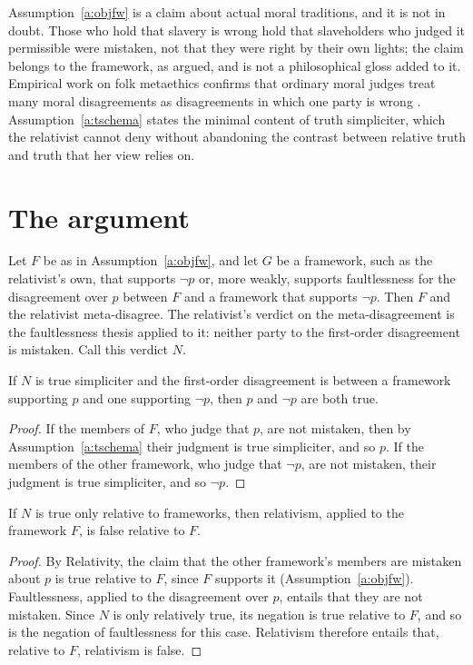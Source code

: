 \documentclass{situationist-preprint}
\begin{document}
Assumption~\ref{a:objfw} is a claim about actual moral traditions, and it is not in doubt. Those who hold that slavery is wrong hold that slaveholders who judged it permissible were mistaken, not that they were right by their own lights; the claim belongs to the framework, as \citet{Dworkin1996} argued, and is not a philosophical gloss added to it. Empirical work on folk metaethics confirms that ordinary moral judges treat many moral disagreements as disagreements in which one party is wrong \citep{GoodwinDarley2008}. Assumption~\ref{a:tschema} states the minimal content of truth simpliciter, which the relativist cannot deny without abandoning the contrast between relative truth and truth that her view relies on.

\section{The argument}

Let $F$ be as in Assumption~\ref{a:objfw}, and let $G$ be a framework, such as the relativist's own, that supports $\neg p$ or, more weakly, supports faultlessness for the disagreement over $p$ between $F$ and a framework that supports $\neg p$. Then $F$ and the relativist meta-disagree. The relativist's verdict on the meta-disagreement is the faultlessness thesis applied to it: neither party to the first-order disagreement is mistaken. Call this verdict $N$.

\begin{lemma}\label{l:abs}
If $N$ is true simpliciter and the first-order disagreement is between a framework supporting $p$ and one supporting $\neg p$, then $p$ and $\neg p$ are both true.
\end{lemma}

\begin{proof}
If the members of $F$, who judge that $p$, are not mistaken, then by Assumption~\ref{a:tschema} their judgment is true simpliciter, and so $p$. If the members of the other framework, who judge that $\neg p$, are not mistaken, their judgment is true simpliciter, and so $\neg p$.
\end{proof}

\begin{lemma}\label{l:rel}
If $N$ is true only relative to frameworks, then relativism, applied to the framework $F$, is false relative to $F$.
\end{lemma}

\begin{proof}
By Relativity, the claim that the other framework's members are mistaken about $p$ is true relative to $F$, since $F$ supports it (Assumption~\ref{a:objfw}). Faultlessness, applied to the disagreement over $p$, entails that they are not mistaken. Since $N$ is only relatively true, its negation is true relative to $F$, and so is the negation of faultlessness for this case. Relativism therefore entails that, relative to $F$, relativism is false.
\end{proof}
\end{document}
